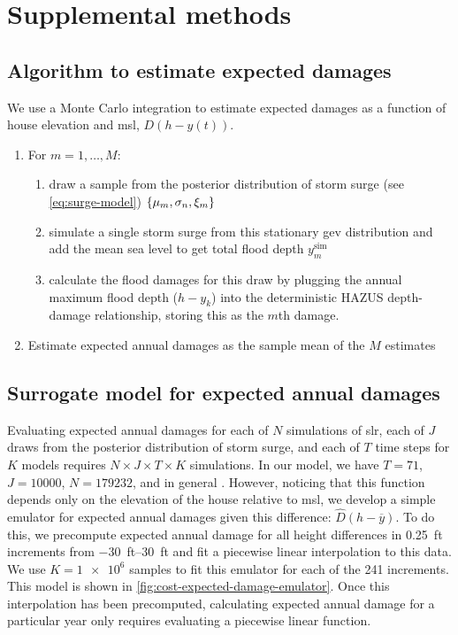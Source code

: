\documentclass[11pt]{article}
\begin{document}
\newpage

\printglossary[type=\acronymtype,title=List of Abbreviations]

\section{Supplemental methods}

\subsection{Algorithm to estimate expected damages}\label{sec:alg-ead}

We use a Monte Carlo integration to estimate expected damages as a function of house elevation and \gls{msl}, $D(h-y(t))$.
\begin{enumerate}
    \item For $m=1, \ldots, M$:
          \begin{enumerate}
              \item draw a sample from the posterior distribution of storm surge (see \cref{eq:surge-model})  $\qty{ \mu_m, \sigma_n, \xi_m}$
              \item simulate a single storm surge from this stationary \gls{gev} distribution and add the mean sea level to get total flood depth $y^\mathrm{sim}_m$
              \item calculate the flood damages for this draw by plugging the annual maximum flood depth ($h - y_k$) into  the deterministic HAZUS depth-damage relationship, storing this as the $m$th damage.
          \end{enumerate}
    \item Estimate expected annual damages as the sample mean of the $M$ estimates
\end{enumerate}

\subsection{Surrogate model for expected annual damages}\label{sec:surrogate-ead}
Evaluating expected annual damages for each of $N$ simulations of \gls{slr}, each of $J$ draws from the posterior distribution of storm surge, and each of $T$ time steps for $K$ models requires $N \times J \times T \times K$ simulations.
In our model, we have $T=71$, $J=\num{10000}$, $N=\num{179232}$, and in general .
However, noticing that this function depends only on the elevation of the house relative to \gls{msl}, we develop a simple emulator for expected annual damages given this difference: $\hat{D}(h - \overline{y})$.
To do this, we  precompute expected annual damage for all height differences in \SI{0.25}{ft} increments from \SIrange{-30}{30}{ft} and fit a piecewise linear interpolation to this data.
We use $K=\num{1e6}$ samples to fit this emulator for each of the 241 increments.
This model is shown in \cref{fig:cost-expected-damage-emulator}.
Once this interpolation has been precomputed, calculating expected annual damage for a particular year only requires evaluating a piecewise linear function.
\end{document}
